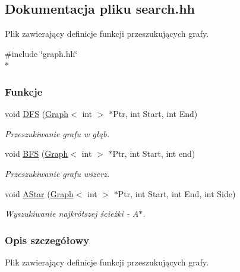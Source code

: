 \hypertarget{search_8hh}{\subsection{Dokumentacja pliku search.\-hh}
\label{search_8hh}
}


Plik zawierający definicje funkcji przeszukujących grafy.  


{\ttfamily \#include \char`\"{}graph.\-hh\char`\"{}}\\*
\subsubsection*{Funkcje}
\begin{DoxyCompactItemize}
\item 
void \hyperlink{search_8hh_a4d4adbe64a2a6393322678a74016d601}{D\-F\-S} (\hyperlink{class_graph}{Graph}$<$ int $>$ $\ast$Ptr, int Start, int End)
\begin{DoxyCompactList}\small\item\em Przeszukiwanie grafu w głąb. \end{DoxyCompactList}\item 
void \hyperlink{search_8hh_a33ed6e24533839b860c5f0597a6fd03a}{B\-F\-S} (\hyperlink{class_graph}{Graph}$<$ int $>$ $\ast$Ptr, int Start, int end)
\begin{DoxyCompactList}\small\item\em Przeszukiwanie grafu wszerz. \end{DoxyCompactList}\item 
void \hyperlink{search_8hh_ac1e3c167799b62e498e9e8e8297e43db}{A\-Star} (\hyperlink{class_graph}{Graph}$<$ int $>$ $\ast$Ptr, int Start, int End, int Side)
\begin{DoxyCompactList}\small\item\em Wyszukiwanie najkrótszej ścieżki -\/ A$\ast$. \end{DoxyCompactList}\end{DoxyCompactItemize}


\subsubsection{Opis szczegółowy}
Plik zawierający definicje funkcji przeszukujących grafy. 

